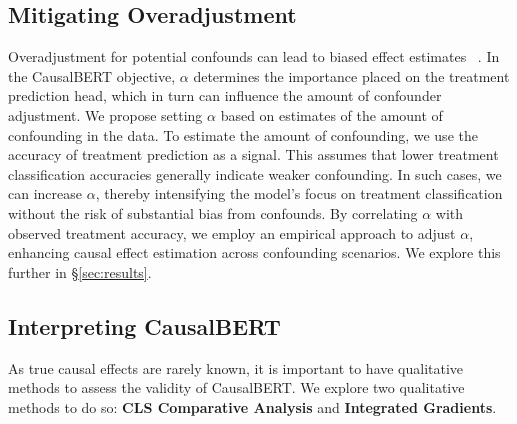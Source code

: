 \documentclass[11pt]{article}
\begin{document}


\subsection{Mitigating Overadjustment}
\label{subsec:mitigating-overadjustment}
Overadjustment for potential confounds can lead to biased effect estimates
~\cite{vanderweele2009relative}. In the CausalBERT objective, $\alpha$ determines the importance placed on the treatment prediction head, which in turn can influence the amount of confounder adjustment. We propose setting $\alpha$ based on estimates of the amount of confounding in the data.
%
To estimate the amount of confounding, we use the accuracy of treatment prediction as a signal.
This assumes that lower treatment classification accuracies generally indicate weaker confounding. In such cases, we can increase \( \alpha \), thereby intensifying the model’s focus on treatment classification without the risk of substantial bias from confounds. 
By correlating \( \alpha \)  with observed treatment accuracy, we employ an empirical approach to adjust $\alpha$, enhancing causal effect estimation across confounding scenarios. We explore this further in \S\ref{sec:results}.%

\subsection{Interpreting CausalBERT}
\label{sec:interpretingcausalbert}
As true causal effects are rarely known, it is important to have qualitative methods to assess the validity of CausalBERT. We explore two qualitative methods to do so: \textbf{CLS Comparative Analysis} and \textbf{Integrated Gradients}.
\end{document}
